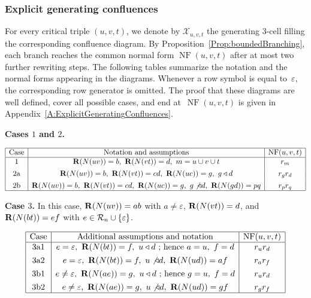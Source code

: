 \documentclass[a4paper, twoside, 11pt, english]{article}
\begin{document}
\subsubsection{Explicit generating confluences}
\label{SSS:ExplicitGeneratingConfluences}

For every critical triple $(u,v,t)$, we denote by $\mathcal X_{u,v,t}$ the
generating $3$-cell filling the corresponding confluence diagram. By
Proposition~\ref{Prop:boundedBranching}, each branch reaches the common normal
form $\operatorname{NF}(u,v,t)$ after at most two further rewriting steps.
The following tables summarize the notation and the normal forms appearing in
the diagrams. Whenever a row symbol is equal to~$\varepsilon$, the
corresponding row generator is omitted.
The proof that these diagrams are well defined, cover all possible
cases, and end at~$\operatorname{NF}(u,v,t)$ is given in
Appendix~\ref{A:ExplicitGeneratingConfluences}.

\medskip

\noindent
\textbf{Cases $1$ and $2$.}

\[
\begin{array}{|c|c|c|}
\hline
\text{Case} & \text{Notation and assumptions} & \operatorname{NF}(u,v,t) \\ \hline
1
&
\R(N(uv))=b,\ \R(N(vt))=d,\ m=u\cup v\cup t
&
r_m
\\[0.4em]
2\mathrm a
&
\R(N(uv))=b,\ \R(N(vt))=cd,\ \R(N(uc))=g,\ g\triangleleft d
&
r_g r_d
\\[0.4em]
2\mathrm b
&
\R(N(uv))=b,\ \R(N(vt))=cd,\ \R(N(uc))=g,\ g\not\triangleleft d,\ \R(N(gd))=pq
&
r_p r_q\\\hline
\end{array}
\]

\medskip

\noindent
\textbf{Case $3$.}
In this case, $\mathbf{R}(N(uv))=ab$ with $a\neq\varepsilon$,
$\mathbf{R}(N(vt))=d$, and $\mathbf{R}(N(bt))=ef$ with
$e\in\mathcal{R}_n\cup\{\varepsilon\}$.

\[
\begin{array}{|c|c|c|}
\hline
\text{Case} & \text{Additional assumptions and notation}
& \operatorname{NF}(u,v,t) \\ \hline
3\mathrm a1
&
e=\varepsilon,\ \mathbf{R}(N(bt))=f,\ u\triangleleft d
\ \text{; hence } a=u,\ f=d
&
r_u r_d
\\[0.4em]
3\mathrm a2
&
e=\varepsilon,\ \mathbf{R}(N(bt))=f,\ u\not\triangleleft d,\ \mathbf{R}(N(ud))=af
&
r_a r_f
\\[0.4em]
3\mathrm b1
&
e\neq\varepsilon,\ \mathbf{R}(N(ae))=g,\ u\triangleleft d
\ \text{; hence } g=u,\ f=d
&
r_u r_d
\\[0.4em]
3\mathrm b2
&
e\neq\varepsilon,\ \mathbf{R}(N(ae))=g,\ u\not\triangleleft d,\ \mathbf{R}(N(ud))=gf
&
r_g r_f\\ \hline
\end{array}
\]
\end{document}

